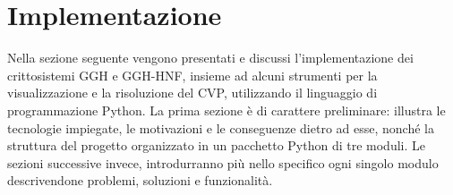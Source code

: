 \chapter{Implementazione}
Nella sezione seguente vengono presentati e discussi l'implementazione dei crittosistemi 
GGH e GGH-HNF, insieme ad alcuni strumenti per la visualizzazione e la risoluzione del 
CVP, utilizzando il linguaggio di programmazione Python. 
La prima sezione è di carattere preliminare: 
illustra le tecnologie impiegate, le motivazioni e le conseguenze dietro ad esse, 
nonché la struttura del progetto organizzato in un pacchetto Python di tre moduli. 
Le sezioni successive invece, introdurranno più nello specifico ogni singolo modulo descrivendone
problemi, soluzioni e funzionalità.
\label{cap:Implementazione}
%
%

%
%

%
%


